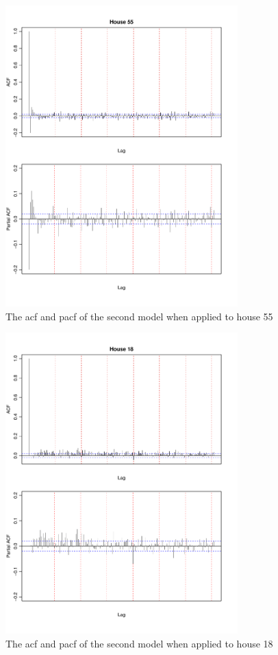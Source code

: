 \begin{figure}
    \centering
    \includegraphics[width=0.8\textwidth]{../../../figures/arimax/ACF_55_long.pdf}
    \caption{The acf and pacf of the second model when applied to house 55}
    \label{fig:Model2_acf_55_long}
\end{figure}    


\begin{figure}
    \centering
    \includegraphics[width=0.8\textwidth]{../../../figures/arimax/ACF_18_long.pdf}
    \caption{The acf and pacf of the second model when applied to house 18}
    \label{fig:Model2_acf_18_long}
\end{figure}    

